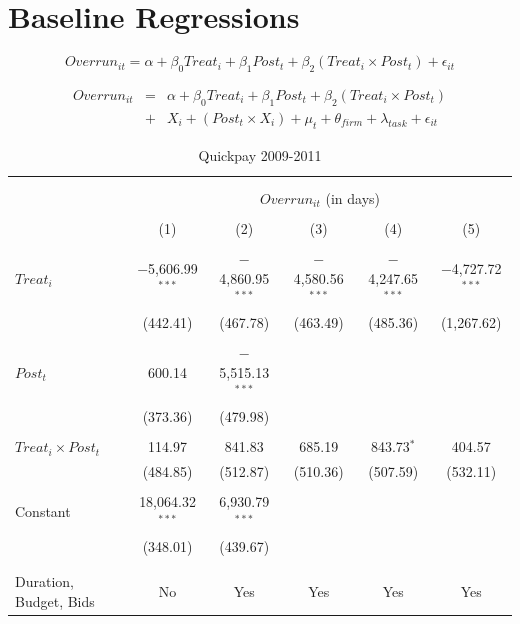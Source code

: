 \documentclass[
]{article}
\begin{document}
\hypertarget{baseline-regressions}{%
\section{Baseline Regressions}\label{baseline-regressions}}

\[ Overrun_{it} = \alpha+\beta_0 Treat_i + \beta_1 Post_t + \beta_2 (Treat_i \times Post_t) + \epsilon_{it}\]

\[ \begin{aligned} Overrun_{it} &=& \alpha+\beta_0 Treat_i + \beta_1 Post_t + \beta_2 (Treat_i \times Post_t)\\
&+&  X_i + (Post_t \times X_i) + \mu_t + \theta_{firm} + \lambda_{task}+ \epsilon_{it}
\end{aligned}\]

\begin{table}[H] \centering 
  \caption{Quickpay 2009-2011} 
  \label{} 
\small 
\begin{tabular}{@{\extracolsep{-2pt}}lccccc} 
\\[-1.8ex]\hline 
\hline \\[-1.8ex] 
\\[-1.8ex] & \multicolumn{5}{c}{$Overrun_{it}$ (in days)} \\ 
\\[-1.8ex] & (1) & (2) & (3) & (4) & (5)\\ 
\hline \\[-1.8ex] 
 $Treat_i$ & $-$5,606.99$^{***}$ & $-$4,860.95$^{***}$ & $-$4,580.56$^{***}$ & $-$4,247.65$^{***}$ & $-$4,727.72$^{***}$ \\ 
  & (442.41) & (467.78) & (463.49) & (485.36) & (1,267.62) \\ 
  & & & & & \\ 
 $Post_t$ & 600.14 & $-$5,515.13$^{***}$ &  &  &  \\ 
  & (373.36) & (479.98) &  &  &  \\ 
  & & & & & \\ 
 $Treat_i \times Post_t$ & 114.97 & 841.83 & 685.19 & 843.73$^{*}$ & 404.57 \\ 
  & (484.85) & (512.87) & (510.36) & (507.59) & (532.11) \\ 
  & & & & & \\ 
 Constant & 18,064.32$^{***}$ & 6,930.79$^{***}$ &  &  &  \\ 
  & (348.01) & (439.67) &  &  &  \\ 
  & & & & & \\ 
\hline \\[-1.8ex] 
Duration, Budget, Bids & No & Yes & Yes & Yes & Yes \\ 

\end{tabular}
\end{table}
\end{document}
